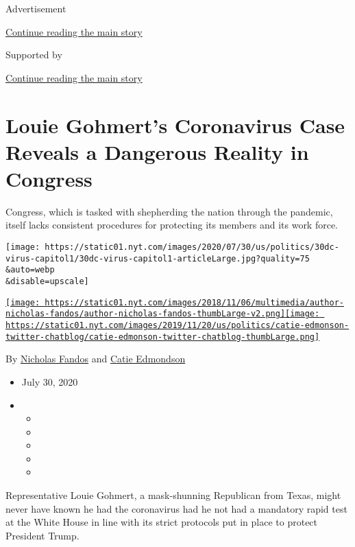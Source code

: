 Advertisement

\protect\hyperlink{after-top}{Continue reading the main story}

Supported by

\protect\hyperlink{after-sponsor}{Continue reading the main story}

\hypertarget{louie-gohmerts-coronavirus-case-reveals-a-dangerous-reality-in-congress}{%
\section{Louie Gohmert's Coronavirus Case Reveals a Dangerous Reality in
Congress}\label{louie-gohmerts-coronavirus-case-reveals-a-dangerous-reality-in-congress}}

Congress, which is tasked with shepherding the nation through the
pandemic, itself lacks consistent procedures for protecting its members
and its work force.

\texttt{[image: https://static01.nyt.com/images/2020/07/30/us/politics/30dc-virus-capitol1/30dc-virus-capitol1-articleLarge.jpg?quality=75\\\&auto=webp\\\&disable=upscale]}

\href{https://www.nytimes.com/by/nicholas-fandos}{\texttt{[image: https://static01.nyt.com/images/2018/11/06/multimedia/author-nicholas-fandos/author-nicholas-fandos-thumbLarge-v2.png]}}\href{https://www.nytimes.com/by/catie-edmondson}{\texttt{[image: https://static01.nyt.com/images/2019/11/20/us/politics/catie-edmonson-twitter-chatblog/catie-edmonson-twitter-chatblog-thumbLarge.png]}}

By \href{https://www.nytimes.com/by/nicholas-fandos}{Nicholas Fandos}
and \href{https://www.nytimes.com/by/catie-edmondson}{Catie Edmondson}

\begin{itemize}
\item
  July 30, 2020
\item
  \begin{itemize}
  \item
  \item
  \item
  \item
  \item
  \end{itemize}
\end{itemize}

Representative Louie Gohmert, a mask-shunning Republican from Texas,
might never have known he had the coronavirus had he not had a mandatory
rapid test at the White House in line with its strict protocols put in
place to protect President Trump.

